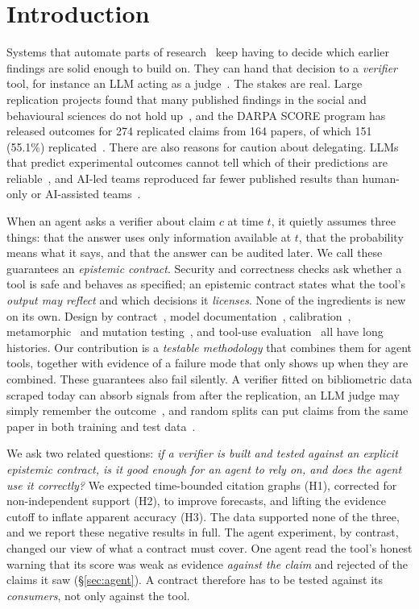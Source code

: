 \documentclass[conference]{IEEEtran}
\begin{document}
\section{Introduction}
Systems that automate parts of research~\cite{lu2024} keep having to decide which earlier findings are solid enough to build on. They can hand that decision to a \emph{verifier} tool, for instance an LLM acting as a judge~\cite{zheng2023}. The stakes are real. Large replication projects found that many published findings in the social and behavioural sciences do not hold up~\cite{osc2015,camerer2016,camerer2018}, and the DARPA SCORE program has released outcomes for 274 replicated claims from 164 papers, of which 151 (55.1\%) replicated~\cite{tyner2026,score_g5sny}. There are also reasons for caution about delegating. LLMs that predict experimental outcomes cannot tell which of their predictions are reliable~\cite{sehwag2026scipredict}, and AI-led teams reproduced far fewer published results than human-only or AI-assisted teams~\cite{brodeur2026aiteams}.

When an agent asks a verifier about claim $c$ at time $t$, it quietly assumes three things: that the answer uses only information available at $t$, that the probability means what it says, and that the answer can be audited later. We call these guarantees an \emph{epistemic contract}. Security and correctness checks ask whether a tool is safe and behaves as specified; an epistemic contract states what the tool's \emph{output may reflect} and which decisions it \emph{licenses}. None of the ingredients is new on its own. Design by contract~\cite{meyer1992}, model documentation~\cite{mitchell2019}, calibration~\cite{guo2017}, metamorphic~\cite{chen2018mt} and mutation testing~\cite{jia2011}, and tool-use evaluation~\cite{wu2026mcpmark} all have long histories. Our contribution is a \emph{testable methodology} that combines them for agent tools, together with evidence of a failure mode that only shows up when they are combined. These guarantees also fail silently. A verifier fitted on bibliometric data scraped today can absorb signals from after the replication, an LLM judge may simply remember the outcome~\cite{sainz2023}, and random splits can put claims from the same paper in both training and test data~\cite{kaufman2012,kapoor2023}.

We ask two related questions: \emph{if a verifier is built and tested against an explicit epistemic contract, is it good enough for an agent to rely on, and does the agent use it correctly?} We expected time-bounded citation graphs (H1), corrected for non-independent support (H2), to improve forecasts, and lifting the evidence cutoff to inflate apparent accuracy (H3). The data supported none of the three, and we report these negative results in full. The agent experiment, by contrast, changed our view of what a contract must cover. One agent read the tool's honest warning that its score was weak as evidence \emph{against the claim} and rejected \agHaikuACRej{} of the claims it saw (\S\ref{sec:agent}). A contract therefore has to be tested against its \emph{consumers}, not only against the tool.
\end{document}
